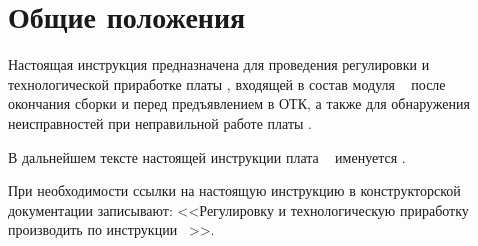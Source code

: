 
\section{Общие положения}
  \point Настоящая инструкция предназначена для проведения регулировки и технологической приработке платы \DocProductShortTitle, входящей в состав модуля \DocProductShortTitle~ 
  после окончания сборки и перед предъявлением в ОТК, а также для обнаружения неисправностей при неправильной работе платы \DocProductShortTitle.
  
  \point В дальнейшем тексте настоящей инструкции плата \DocProductShortTitle~ именуется \DocProductShortTitle.
  
  \point При необходимости ссылки на настоящую инструкцию в конструкторской документации записывают: 
	<<Регулировку и технологическую приработку производить по инструкции \DocProductSignature~\DocSignatureSuffix>>.

